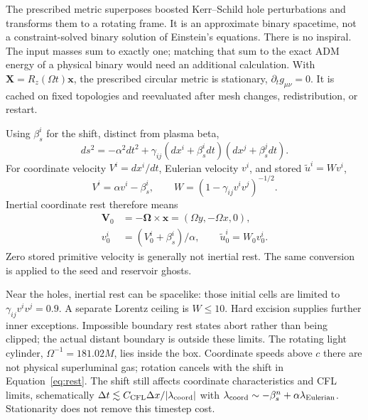 \documentclass[twocolumn,anonymous]{aastex701}
\newcommand{\utilde}{\widetilde{u}}
\begin{document}
The prescribed metric superposes boosted Kerr--Schild hole perturbations and transforms them to a rotating frame. It is an approximate binary spacetime, not a constraint-solved binary solution of Einstein's equations. There is no inspiral. The input masses sum to exactly one; matching that sum to the exact ADM energy of a physical binary would need an additional calculation. With $\boldsymbol X=R_z(\Omega t)\boldsymbol x$, the prescribed circular metric is stationary, $\partial_tg_{\mu\nu}=0$. It is cached on fixed topologies and reevaluated after mesh changes, redistribution, or restart.

Using $\beta_s^i$ for the shift, distinct from plasma beta,
\begin{equation}
 ds^2=-\alpha^2dt^2+\gamma_{ij}(dx^i+\beta_s^idt)(dx^j+\beta_s^jdt).
\end{equation}
For coordinate velocity $V^i=dx^i/dt$, Eulerian velocity $v^i$, and stored $\utilde^i=Wv^i$,
\begin{equation}
 V^i=\alpha v^i-\beta_s^i,\qquad
 W=(1-\gamma_{ij}v^iv^j)^{-1/2}.\label{eq:velocity}
\end{equation}
Inertial coordinate rest therefore means
\begin{align}
 \boldsymbol V_0&=-\boldsymbol\Omega\times\boldsymbol x
 =(\Omega y,-\Omega x,0),\nonumber\\
 v_0^i&=(V_0^i+\beta_s^i)/\alpha,\qquad \utilde_0^i=W_0v_0^i.\label{eq:rest}
\end{align}
Zero stored primitive velocity is generally not inertial rest. The same conversion is applied to the seed and reservoir ghosts.

Near the holes, inertial rest can be spacelike: those initial cells are limited to $\gamma_{ij}v^iv^j=0.9$. A separate Lorentz ceiling is $W\leq10$. Hard excision supplies further inner exceptions. Impossible boundary rest states abort rather than being clipped; the actual distant boundary is outside these limits. The rotating light cylinder, $\Omega^{-1}=181.02M$, lies inside the box. Coordinate speeds above $c$ there are not physical superluminal gas; rotation cancels with the shift in Equation~\ref{eq:rest}. The shift still affects coordinate characteristics and CFL limits, schematically $\Delta t\lesssim C_{\rm CFL}\Delta x/|\lambda_{\rm coord}|$ with $\lambda_{\rm coord}\sim-\beta_s^n+\alpha\lambda_{\rm Eulerian}$. Stationarity does not remove this timestep cost.
\end{document}

